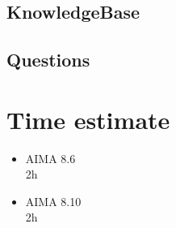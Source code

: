 \documentclass{scrartcl}
\begin{document}

\subsection{KnowledgeBase}



\subsection{Questions}


\section{Time estimate}
\begin{itemize}
	\item AIMA 8.6\\
	2h
	\item AIMA 8.10\\
	2h 
\end{itemize}

	
\end{document}
